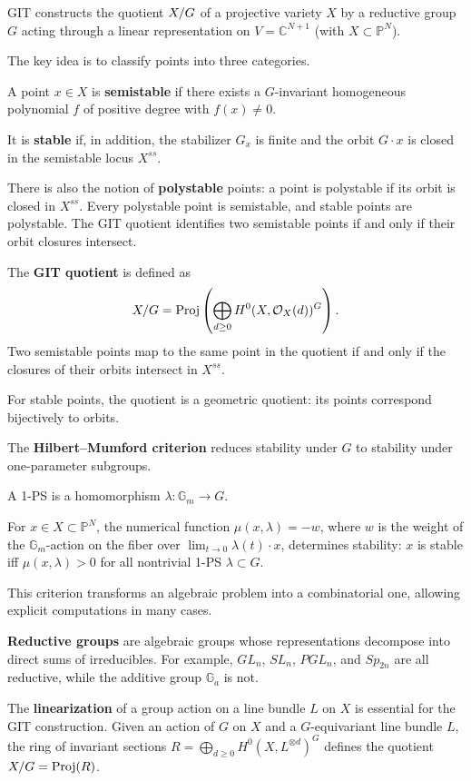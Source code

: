 GIT constructs the quotient $X /\/ G$ of a projective variety $X$ by a reductive group $G$ acting through a linear representation on $V = \mathbb{C}^{N+1}$ (with $X \subset \mathbb{P}^N$).

The key idea is to classify points into three categories.

A point $x \in X$ is \textbf{semistable} if there exists a $G$-invariant homogeneous polynomial $f$ of positive degree with $f(x) \neq 0$.

It is \textbf{stable} if, in addition, the stabilizer $G_x$ is finite and the orbit $G \cdot x$ is closed in the semistable locus $X^{ss}$.

There is also the notion of \textbf{polystable} points: a point is polystable if its orbit is closed in $X^{ss}$. Every polystable point is semistable, and stable points are polystable. The GIT quotient identifies two semistable points if and only if their orbit closures intersect.

The \textbf{GIT quotient} is defined as
\[X /\/ G = \operatorname{Proj}\left(\bigoplus_{d \geq 0} H^0(X, \mathcal{O}_X(d))^G\right).\]
Two semistable points map to the same point in the quotient if and only if the closures of their orbits intersect in $X^{ss}$.

For stable points, the quotient is a geometric quotient: its points correspond bijectively to orbits.

The \textbf{Hilbert--Mumford criterion} reduces stability under $G$ to stability under one-parameter subgroups.

A 1-PS is a homomorphism $\lambda: \mathbb{G}_m \to G$.

For $x \in X \subset \mathbb{P}^N$, the numerical function $\mu(x, \lambda) = -w$, where $w$ is the weight of the $\mathbb{G}_m$-action on the fiber over $\lim_{t \to 0} \lambda(t) \cdot x$, determines stability: $x$ is stable iff $\mu(x, \lambda) > 0$ for all nontrivial 1-PS $\lambda \subset G$.

This criterion transforms an algebraic problem into a combinatorial one, allowing explicit computations in many cases.

\textbf{Reductive groups} are algebraic groups whose representations decompose into direct sums of irreducibles. For example, $GL_n$, $SL_n$, $PGL_n$, and $Sp_{2n}$ are all reductive, while the additive group $\mathbb{G}_a$ is not.

The \textbf{linearization} of a group action on a line bundle $L$ on $X$ is essential for the GIT construction. Given an action of $G$ on $X$ and a $G$-equivariant line bundle $L$, the ring of invariant sections $R = \bigoplus_{d \geq 0} H^0(X, L^{\otimes d})^G$ defines the quotient $X /\/ G = \operatorname{Proj}(R)$.

